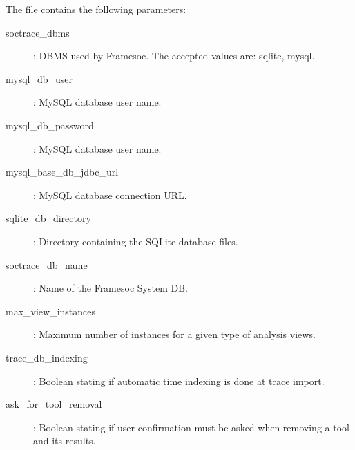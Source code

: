 \documentclass[twoside]{article}
\begin{document}
\begin{sloppypar}
The file contains the following parameters:
\begin{description}
 \item[soctrace\_dbms]: DBMS used by Framesoc. The accepted values are: sqlite, mysql.
 \item[mysql\_db\_user]: MySQL database user name.
 \item[mysql\_db\_password]: MySQL database user name.
 \item[mysql\_base\_db\_jdbc\_url]: MySQL database connection URL.
 \item[sqlite\_db\_directory]: Directory containing the SQLite database files.
 \item[soctrace\_db\_name]: Name of the Framesoc System DB.
 \item[max\_view\_instances]: Maximum number of instances for a given type of analysis views.
 \item[trace\_db\_indexing]: Boolean stating if automatic time indexing is done at trace import.
 \item[ask\_for\_tool\_removal]: Boolean stating if user confirmation must be asked when removing a tool and its results.
\end{description}

\newpage
\renewcommand{\refname}{References}
{}


\end{sloppypar} 
\end{document}
